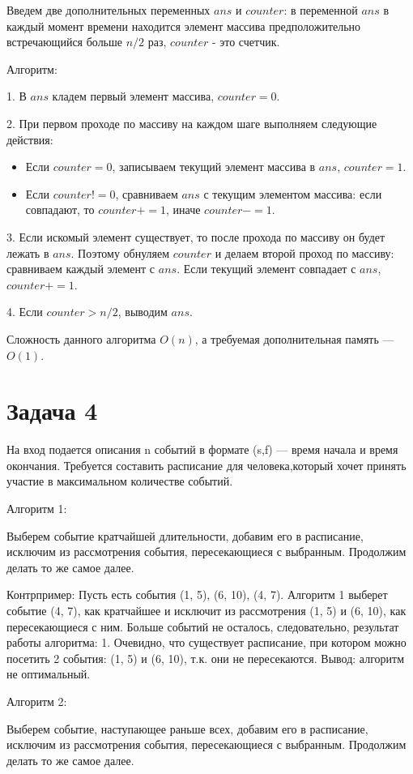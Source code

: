 \documentclass{article}
\begin{document}
Введем две дополнительных переменных $ans$ и  $counter$: в переменной $ans$ в каждый момент времени находится элемент массива предположительно встречающийся больше $n/2$ раз, $counter$ - это счетчик.

Алгоритм:

1. В $ans$ кладем первый элемент массива, $counter = 0$.

2. При первом проходе по массиву на каждом шаге выполняем следующие действия:
\begin{itemize}
    \item Если $counter = 0$, записываем текущий элемент массива в $ans$,  $counter = 1$.
    
    \item Если $counter != 0$, сравниваем $ans$ с текущим элементом массива: если совпадают, то $counter += 1$, иначе $counter -= 1$.
\end{itemize}
3. Если искомый элемент существует, то после прохода по массиву он будет лежать в $ans$. Поэтому обнуляем $counter$ и делаем второй проход по массиву: сравниваем каждый элемент с $ans$. Если текущий элемент совпадает с $ans$, $counter += 1$. 

4. Если $counter > n/2$, выводим $ans$.

Сложность данного алгоритма $O(n)$, а требуемая дополнительная память — $O(1)$.

\section*{Задача 4}
На вход подается описания n событий в формате (s,f) — время начала и время окончания. Требуется составить расписание для человека,который хочет принять участие в максимальном количестве событий.

Алгоритм 1:

Выберем событие кратчайшей длительности, добавим его в расписание, исключим из рассмотрения события, пересекающиеся с выбранным. Продолжим делать то же самое далее.

Контрпример:
    Пусть есть события (1, 5), (6, 10), (4, 7). Алгоритм 1 выберет событие (4, 7), как кратчайшее и исключит из рассмотрения (1, 5) и (6, 10), как пересекающиеся с ним. Больше событий не осталось, следовательно, результат работы алгоритма: 1. Очевидно, что существует расписание, при котором можно посетить 2 события: (1, 5) и (6, 10), т.к. они не пересекаются. Вывод: алгоритм не оптимальный.

Алгоритм 2:

Выберем событие, наступающее раньше всех, добавим его в расписание, исключим из рассмотрения события, пересекающиеся с выбранным. Продолжим делать то же самое далее.
\end{document}
